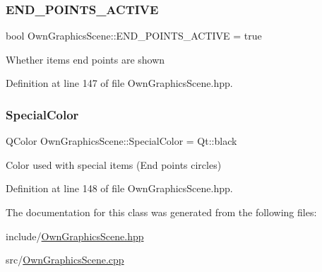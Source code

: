 \subsubsection{\texorpdfstring{E\+N\+D\+\_\+\+P\+O\+I\+N\+T\+S\+\_\+\+A\+C\+T\+I\+VE}{END\_POINTS\_ACTIVE}}
{\footnotesize\ttfamily bool Own\+Graphics\+Scene\+::\+E\+N\+D\+\_\+\+P\+O\+I\+N\+T\+S\+\_\+\+A\+C\+T\+I\+VE = true\hspace{0.3cm}{\ttfamily [static]}}

Whether items end points are shown 

Definition at line 147 of file Own\+Graphics\+Scene.\+hpp.

\mbox{\label{classOwnGraphicsScene_af51cea46e8b0cffa341ba88c2b801e81}} 
\subsubsection{\texorpdfstring{Special\+Color}{SpecialColor}}
{\footnotesize\ttfamily Q\+Color Own\+Graphics\+Scene\+::\+Special\+Color = Qt\+::black\hspace{0.3cm}{\ttfamily [static]}}

Color used with special items (End points circles) 

Definition at line 148 of file Own\+Graphics\+Scene.\+hpp.



The documentation for this class was generated from the following files\+:\begin{DoxyCompactItemize}
\item 
include/\mbox{\hyperlink{OwnGraphicsScene_8hpp}{Own\+Graphics\+Scene.\+hpp}}\item 
src/\mbox{\hyperlink{OwnGraphicsScene_8cpp}{Own\+Graphics\+Scene.\+cpp}}\end{DoxyCompactItemize}
